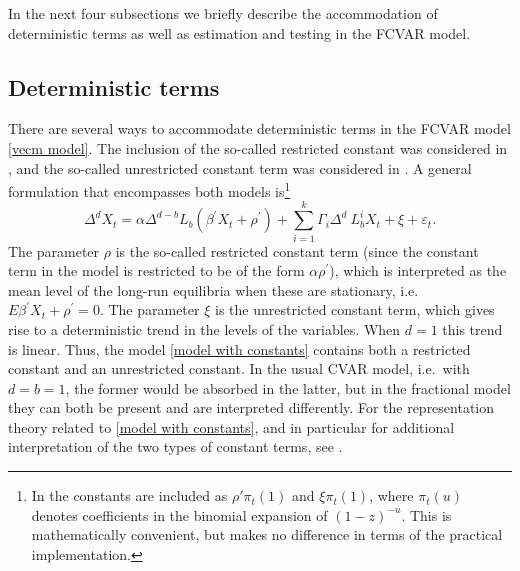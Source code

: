 \documentclass[article]{jss}
\begin{document}
In the next four subsections we briefly describe the accommodation of deterministic terms as well as estimation and testing in the FCVAR model.

\subsection{Deterministic terms}

There are several ways to accommodate deterministic terms in the FCVAR model \eqref{vecm model}. The inclusion of the so-called restricted constant was considered in \cite{johansen2012likelihood}, and the so-called unrestricted constant term was considered in \cite{Dolatabadi2014}. A general formulation that encompasses both models is\footnote{In \cite{Dolatabadi2014} the constants are included as $\rho' \pi_t(1)$ and $\xi \pi_t(1)$, where $\pi_t(u)$ denotes coefficients in the binomial expansion of $(1-z)^{-u}$. This is mathematically convenient, but makes no difference in terms of the practical implementation.}
\begin{equation}
\Delta^{d}X_{t}= \alpha \Delta^{d-b} L_{b} (\beta^{\prime} X_{t} +\rho^{\prime}) + 
\sum_{i=1}^{k}\Gamma_{i}\Delta^{d}\ L_{b}^{i}X_{t} +\xi
+ \varepsilon_{t}.
\label{model with constants}
\end{equation}
The parameter $\rho $ is the so-called restricted constant term (since the constant term in the model is restricted to be of the form $\alpha \rho ^{\prime }$), which is interpreted as the mean level of the long-run equilibria when these are stationary, i.e.\ $E\beta ^{\prime }X_{t}+\rho ^{\prime }=0$. The parameter $\xi$ is the unrestricted constant term, which gives rise to a deterministic trend in the levels of the variables. When $d=1$ this trend is linear. Thus, the model \eqref{model with constants} contains both a restricted constant and an unrestricted constant. In the usual CVAR model, i.e.\ with $d=b=1$, the former would be absorbed in the latter, but in the fractional model they can both be present and are interpreted differently. For the representation theory related to \eqref{model with constants}, and in particular for additional interpretation of the two types of constant terms, see \cite{Dolatabadi2014}.
\end{document}
